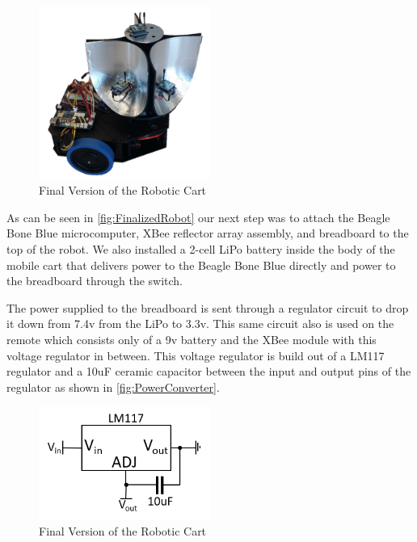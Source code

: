 \begin{figure}
	\centering
	\includegraphics[width=0.5\textwidth]{figs/img/Finalized_robot.png}
	\caption{Final Version of the Robotic Cart}
 	\label{fig:FinalizedRobot}
\end{figure}

\vspace*{12pt}
\noindent
As can be seen in \autoref{fig:FinalizedRobot} our next step was to attach the Beagle Bone Blue microcomputer, XBee reflector array assembly, and breadboard to the top of the robot.  We also installed a 2-cell LiPo battery inside the body of the mobile cart that delivers power to the Beagle Bone Blue directly and power to the breadboard through the switch. \par
The power supplied to the breadboard is sent through a regulator circuit to drop it down from 7.4v from the LiPo to 3.3v.  This same circuit also is used on the remote which consists only of a 9v battery and the XBee module with this voltage regulator in between.  This voltage regulator is build out of a LM117 regulator and a 10uF ceramic capacitor between the input and output pins of the regulator as shown in \autoref{fig:PowerConverter}.

\begin{figure}
	\centering
	\includegraphics[width=0.5\textwidth]{figs/img/PowerConverter.png}
	\caption{Final Version of the Robotic Cart}
 	\label{fig:PowerConverter}
\end{figure}

